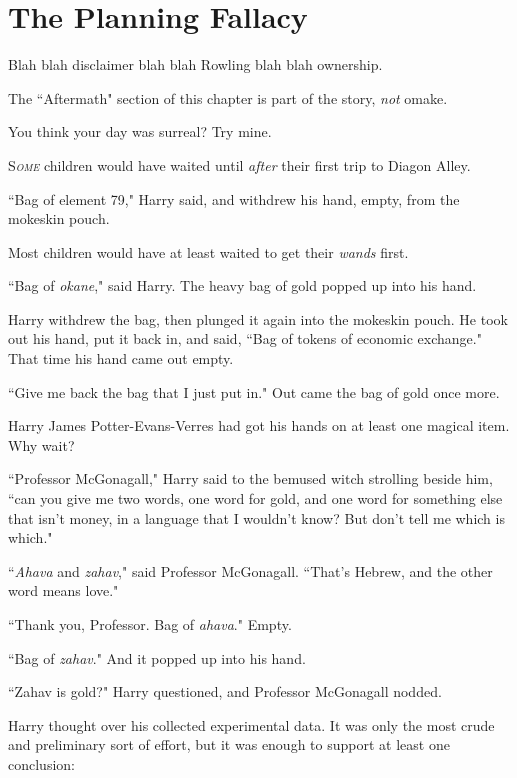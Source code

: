 \chapter{The Planning Fallacy}

\begin{chapterOpeningAuthorNote}
Blah blah disclaimer blah blah Rowling blah blah ownership.

The ``Aftermath" section of this chapter is part of the story, \emph{not} omake.
\end{chapterOpeningAuthorNote}
\begin{chapterOpeningQuote}
You think your day was surreal? Try mine.
\end{chapterOpeningQuote}

\lettrine{S}{\emph{ome}} children would have waited until \emph{after} their first trip to Diagon Alley.

``Bag of element 79," Harry said, and withdrew his hand, empty, from the mokeskin pouch.

Most children would have at least waited to get their \emph{wands} first.

``Bag of \emph{okane}," said Harry. The heavy bag of gold popped up into his hand.

Harry withdrew the bag, then plunged it again into the mokeskin pouch. He took out his hand, put it back in, and said, ``Bag of tokens of economic exchange." That time his hand came out empty.

``Give me back the bag that I just put in." Out came the bag of gold once more.

Harry James Potter-Evans-Verres had got his hands on at least one magical item. Why wait?

``Professor McGonagall," Harry said to the bemused witch strolling beside him, ``can you give me two words, one word for gold, and one word for something else that isn't money, in a language that I wouldn't know? But don't tell me which is which."

``\emph{Ahava} and \emph{zahav}," said Professor McGonagall. ``That's Hebrew, and the other word means love."

``Thank you, Professor. Bag of \emph{ahava}." Empty.

``Bag of \emph{zahav}." And it popped up into his hand.

``Zahav is gold?" Harry questioned, and Professor McGonagall nodded.

Harry thought over his collected experimental data. It was only the most crude and preliminary sort of effort, but it was enough to support at least one conclusion:

